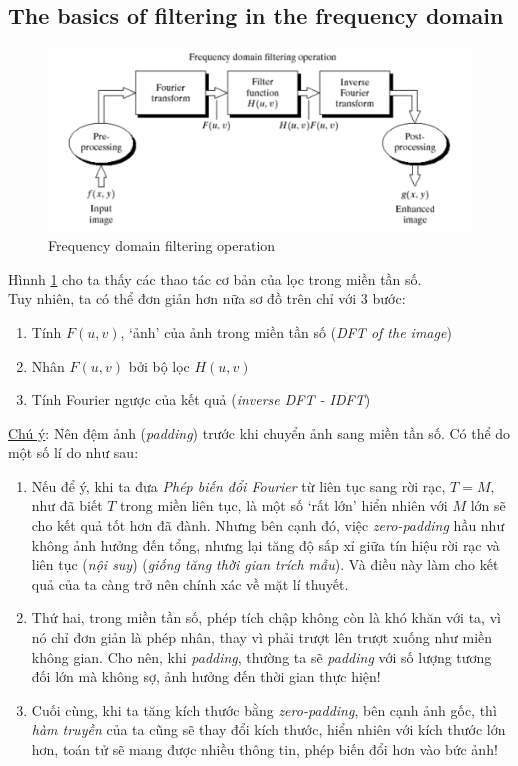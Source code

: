 \documentclass{article}
\begin{document}
        \subsection{The basics of filtering in the frequency domain}
        \begin{figure}[ht!]
            \centering
            \includegraphics[width = 0.7\linewidth]{fo6.png}
            \caption{Frequency domain filtering operation}
            \label{fig8}
        \end{figure}
        Hìnnh \ref{fig8} cho ta thấy các thao tác cơ bản của lọc trong miền tần số.\\
        Tuy nhiên, ta có thể đơn giản hơn nữa sơ đồ trên chỉ với 3 bước:
        \begin{enumerate}
            \item Tính $F(u,v)$, `ảnh' của ảnh trong miền tần số (\textit{DFT of the image})
            \item Nhân $F(u,v)$ bởi bộ lọc $H(u,v)$
            \item Tính Fourier ngược của kết quả (\textit{inverse DFT - IDFT})
        \end{enumerate}
        \underline{Chú ý}: Nên đệm ảnh (\textit{padding}) trước khi chuyển ảnh sang miền tần số. Có thể do một số lí do như sau:
        \begin{enumerate}
            \item Nếu để ý, khi ta đưa \textit{Phép biến đổi Fourier} từ liên tục sang rời rạc, $T=M$, như đã biết $T$ trong miền liên tục, là một số `rất lớn' hiển nhiên với $M$ lớn sẽ cho kết quả tốt hơn đã đành. Nhưng bên cạnh đó, việc \textit{zero-padding} hầu như không ảnh hưởng đến tổng, nhưng lại tăng độ sấp xỉ giữa tín hiệu rời rạc và liên tục (\textit{nội suy}) (\textit{giống tăng thời gian trích mẫu}). Và điều này làm cho kết quả của ta càng trở nên chính xác về mặt lí thuyết.
            \item Thứ hai, trong miền tần số, phép tích chập không còn là khó khăn với ta, vì nó chỉ đơn giản là phép nhân, thay vì phải trượt lên trượt xuống như miền không gian. Cho nên, khi \textit{padding}, thường ta sẽ \textit{padding} với số lượng tương đối lớn mà không sợ, ảnh hưởng đến thời gian thực hiện!
            \item Cuối cùng, khi ta tăng kích thước bằng \textit{zero-padding}, bên cạnh ảnh gốc, thì \textit{hàm truyền} của ta cũng sẽ thay đổi kích thước, hiển nhiên với kích thước lớn hơn, toán tử sẽ mang được nhiều thông tin, phép biến đổi hơn vào bức ảnh!
        \end{enumerate}
\end{document}
